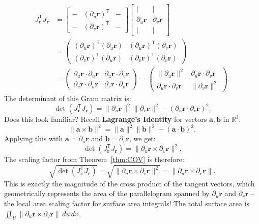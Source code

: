 \documentclass[12pt]{article}
\theoremstyle{definition} %
\theoremstyle{plain} %
\theoremstyle{remark} %
\begin{document}
\begin{align*} J_{\mathbf{r}}^{\mathsf{T}} J_{\mathbf{r}} &=
    \begin{bmatrix} - & (\partial_u \mathbf{r})^{\mathsf{T}} & - \\ - & (\partial_v \mathbf{r})^{\mathsf{T}} & - \end{bmatrix}
    \begin{bmatrix} | & | \\ \partial_u \mathbf{r} & \partial_v \mathbf{r} \\ | & | \end{bmatrix} \\ &=
    \begin{pmatrix}
        (\partial_u \mathbf{r})^{\mathsf{T}} (\partial_u \mathbf{r}) & (\partial_u \mathbf{r})^{\mathsf{T}} (\partial_v \mathbf{r}) \\
        (\partial_v \mathbf{r})^{\mathsf{T}} (\partial_u \mathbf{r}) & (\partial_v \mathbf{r})^{\mathsf{T}} (\partial_v \mathbf{r})
    \end{pmatrix} \\ &=
    \begin{pmatrix}
        \partial_u \mathbf{r} \cdot \partial_u \mathbf{r} & \partial_u \mathbf{r} \cdot \partial_v \mathbf{r} \\
        \partial_v \mathbf{r} \cdot \partial_u \mathbf{r} & \partial_v \mathbf{r} \cdot \partial_v \mathbf{r}
    \end{pmatrix} =
    \begin{pmatrix}
        \|\partial_u \mathbf{r}\|^2 & \partial_u \mathbf{r} \cdot \partial_v \mathbf{r} \\
        \partial_u \mathbf{r} \cdot \partial_v \mathbf{r} & \|\partial_v \mathbf{r}\|^2
    \end{pmatrix}.
\end{align*}
The determinant of this Gram matrix is:
\[
    \det(J_{\mathbf{r}}^{\mathsf{T}} J_{\mathbf{r}}) = \|\partial_u \mathbf{r}\|^2 \|\partial_v \mathbf{r}\|^2 - (\partial_u \mathbf{r} \cdot \partial_v \mathbf{r})^2.
\]
Does this look familiar? Recall \textbf{Lagrange's Identity} for vectors $\mathbf{a}, \mathbf{b}$ in $\mathbb{R}^3$:
\[
    \|\mathbf{a} \times \mathbf{b}\|^2 = \|\mathbf{a}\|^2 \|\mathbf{b}\|^2 - (\mathbf{a} \cdot \mathbf{b})^2.
\]
Applying this with $\mathbf{a} = \partial_u \mathbf{r}$ and $\mathbf{b} = \partial_v \mathbf{r}$, we get:
\[
    \det(J_{\mathbf{r}}^{\mathsf{T}} J_{\mathbf{r}}) = \|\partial_u \mathbf{r} \times \partial_v \mathbf{r}\|^2.
\]
The scaling factor from Theorem~\ref{thm:COV} is therefore:
\[
    \sqrt{\det(J_{\mathbf{r}}^{\mathsf{T}} J_{\mathbf{r}})} = \sqrt{\|\partial_u \mathbf{r} \times \partial_v \mathbf{r}\|^2} = \|\partial_u \mathbf{r} \times \partial_v \mathbf{r}\|.
\]
This is exactly the magnitude of the cross product of the tangent vectors, which geometrically represents the area of the parallelogram spanned by $\partial_u \mathbf{r}$ and $\partial_v \mathbf{r}$ – the local area scaling factor for surface area integrals! The total surface area is $\iint_U \|\partial_u \mathbf{r} \times \partial_v \mathbf{r}\| \,du\,dv$.
\end{document}
